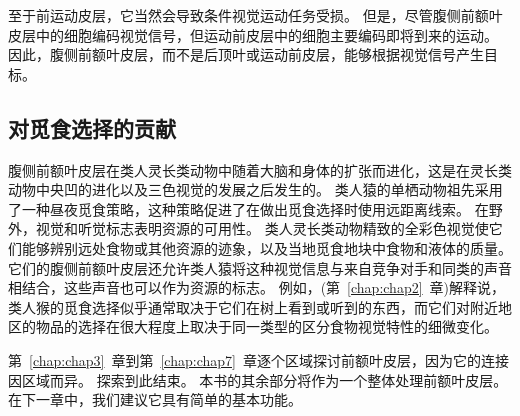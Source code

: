 至于前运动皮层，它当然会导致条件视觉运动任务受损\cite{halsband1985premotor,petrides2019conditional}。
但是，尽管腹侧前额叶皮层中的细胞编码视觉信号，但运动前皮层中的细胞主要编码即将到来的运动\cite{pllegrino1991neurophysiological}。
因此，腹侧前额叶皮层，而不是后顶叶或运动前皮层，能够根据视觉信号产生目标。



\subsection{对觅食选择的贡献}
\par

腹侧前额叶皮层在类人灵长类动物中随着大脑和身体的扩张而进化，这是在灵长类动物中央凹的进化以及三色视觉的发展之后发生的。
类人猿的单栖动物祖先采用了一种昼夜觅食策略，这种策略促进了在做出觅食选择时使用远距离线索。
在野外，视觉和听觉标志表明资源的可用性。
类人灵长类动物精致的全彩色视觉使它们能够辨别远处食物或其他资源的迹象，以及当地觅食地块中食物和液体的质量。
它们的腹侧前额叶皮层还允许类人猿将这种视觉信息与来自竞争对手和同类的声音相结合，这些声音也可以作为资源的标志。
例如，(第~\ref{chap:chap2}~章)解释说，类人猴的觅食选择似乎通常取决于它们在树上看到或听到的东西，而它们对附近地区的物品的选择在很大程度上取决于同一类型的区分食物视觉特性的细微变化。
\par


第~\ref{chap:chap3}~章到第~\ref{chap:chap7}~章逐个区域探讨前额叶皮层，因为它的连接因区域而异。
探索到此结束。
本书的其余部分将作为一个整体处理前额叶皮层。 
在下一章中，我们建议它具有简单的基本功能。

